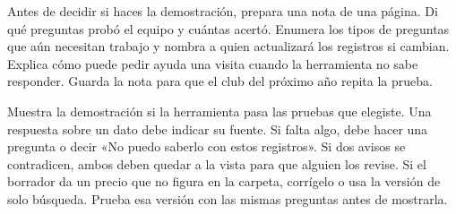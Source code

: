 {Antes de decidir si haces la demostración, prepara una nota de una página. Di qué preguntas probó el equipo y cuántas acertó. Enumera los tipos de preguntas que aún necesitan trabajo y nombra a quien actualizará los registros si cambian. Explica cómo puede pedir ayuda una visita cuando la herramienta no sabe responder. Guarda la nota para que el club del próximo año repita la prueba.}

{Muestra la demostración si la herramienta pasa las pruebas que elegiste. Una respuesta sobre un dato debe indicar su fuente. Si falta algo, debe hacer una pregunta o decir «No puedo saberlo con estos registros». Si dos avisos se contradicen, ambos deben quedar a la vista para que alguien los revise. Si el borrador da un precio que no figura en la carpeta, corrígelo o usa la versión de solo búsqueda. Prueba esa versión con las mismas preguntas antes de mostrarla.}

